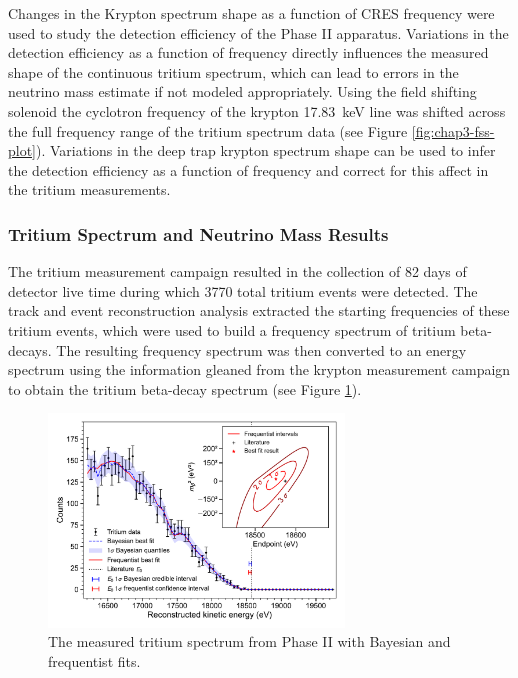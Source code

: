 Changes in the Krypton spectrum shape as a function of CRES frequency were used to study the detection efficiency of the Phase II apparatus. Variations in the detection efficiency as a function of frequency directly influences the measured shape of the continuous tritium spectrum, which can lead to errors in the neutrino mass estimate if not modeled appropriately. Using the field shifting solenoid the cyclotron frequency of the krypton 17.83~keV line was shifted across the full frequency range of the tritium spectrum data (see Figure \ref{fig:chap3-fss-plot}). Variations in the deep trap krypton spectrum shape can be used to infer the detection efficiency as a function of frequency and correct for this affect in the tritium measurements.

\subsubsection*{Tritium Spectrum and Neutrino Mass Results}

The tritium measurement campaign resulted in the collection of 82 days of detector live time during which 3770 total tritium events were detected. The track and event reconstruction analysis extracted the starting frequencies of these tritium events, which were used to build a frequency spectrum of tritium beta-decays. The resulting frequency spectrum was then converted to an energy spectrum using the information gleaned from the krypton measurement campaign to obtain the tritium beta-decay spectrum (see Figure \ref{fig:chap3-final-tritium-fit}).
\begin{figure}
    \centering
    \includegraphics[width=0.7\textwidth]{figs/Chapter-3/12-03-22A_final_E0_real_data_phase_II_tritium_fit_1d.pdf}
    \caption{The measured tritium spectrum from Phase II with Bayesian and frequentist fits.}
    \label{fig:chap3-final-tritium-fit}
\end{figure}

